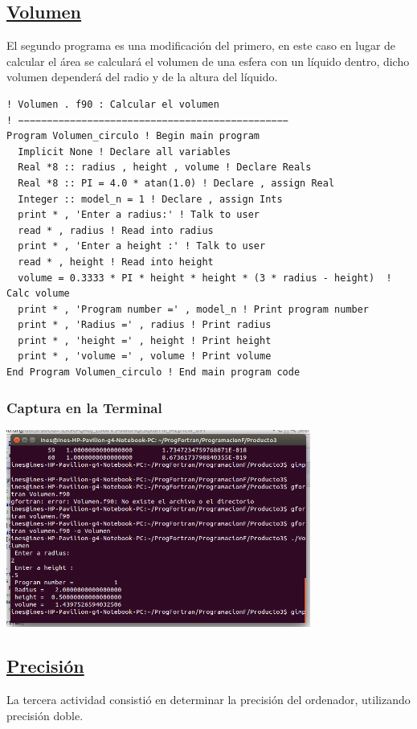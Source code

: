 \documentclass[a4paper]{article}
\begin{document}
\subsection{\underline{ Volumen }}
El segundo programa es una modificación del primero, en este caso en lugar de calcular el área se calculará el volumen de una esfera con un líquido dentro, dicho volumen dependerá del radio y de la altura del líquido.

\begin{verbatim}! Volumen . f90 : Calcular el volumen
! −−−−−−−−−−−−−−−−−−−−−−−−−−−−−−−−−−−−−−−−−−−−−−−
Program Volumen_circulo ! Begin main program
  Implicit None ! Declare all variables
  Real *8 :: radius , height , volume ! Declare Reals
  Real *8 :: PI = 4.0 * atan(1.0) ! Declare , assign Real
  Integer :: model_n = 1 ! Declare , assign Ints
  print * , 'Enter a radius:' ! Talk to user
  read * , radius ! Read into radius
  print * , 'Enter a height :' ! Talk to user
  read * , height ! Read into height
  volume = 0.3333 * PI * height * height * (3 * radius - height)  ! Calc volume
  print * , 'Program number =' , model_n ! Print program number
  print * , 'Radius =' , radius ! Print radius
  print * , 'height =' , height ! Print height
  print * , 'volume =' , volume ! Print volume
End Program Volumen_circulo ! End main program code
\end{verbatim}
  
\subsubsection{Captura en la Terminal}
  \begin{center}
\includegraphics[width=10cm]{volumen.png}
\end{center}
  
\subsection{\underline{Precisión}}
La tercera actividad consistió en determinar la precisión del ordenador, utilizando precisión doble.
  
\end{document}
